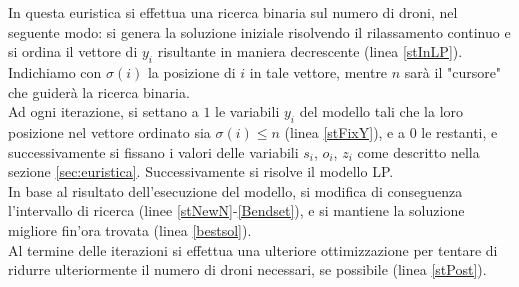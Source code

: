 In questa euristica si effettua una ricerca binaria sul numero di droni, nel seguente modo: si genera la soluzione iniziale risolvendo il rilassamento continuo e si ordina il vettore di $y_i$ risultante in maniera decrescente (linea \ref{stInLP}). Indichiamo con $\sigma(i)$ la posizione di $i$ in tale vettore, mentre $n$ sarà il "cursore" che guiderà la ricerca binaria. \\
Ad ogni iterazione, si settano a $1$ le variabili $y_i$ del modello tali che la loro posizione nel vettore ordinato sia $\sigma(i) \leq n$ (linea \ref{stFixY}), e a $0$ le restanti, e successivamente si fissano i valori delle variabili $s_i$, $o_i$, $z_i$ come descritto nella sezione \ref{sec:euristica}. Successivamente si risolve il modello LP. \\
In base al risultato dell'esecuzione del modello, si modifica di conseguenza l'intervallo di ricerca (linee \ref{stNewN}-\ref{Bendset}), e si mantiene la soluzione migliore fin'ora trovata (linea \ref{bestsol}).\\
Al termine delle iterazioni si effettua una ulteriore ottimizzazione per tentare di ridurre ulteriormente il numero di droni necessari, se possibile (linea \ref{stPost}).	\\
